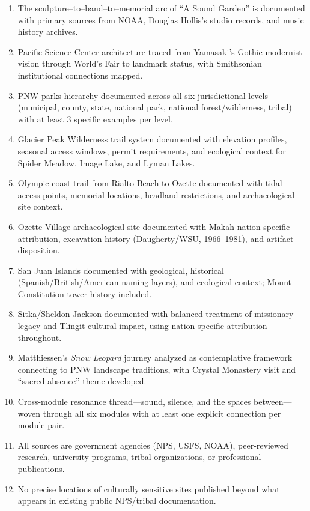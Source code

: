 \documentclass[11pt,letterpaper]{article}
\begin{document}
\begin{enumerate}[leftmargin=2em]
\item The sculpture--to--band--to--memorial arc of ``A Sound Garden'' is documented with primary sources from NOAA, Douglas Hollis's studio records, and music history archives.
\item Pacific Science Center architecture traced from Yamasaki's Gothic-modernist vision through World's Fair to landmark status, with Smithsonian institutional connections mapped.
\item PNW parks hierarchy documented across all six jurisdictional levels (municipal, county, state, national park, national forest/wilderness, tribal) with at least 3 specific examples per level.
\item Glacier Peak Wilderness trail system documented with elevation profiles, seasonal access windows, permit requirements, and ecological context for Spider Meadow, Image Lake, and Lyman Lakes.
\item Olympic coast trail from Rialto Beach to Ozette documented with tidal access points, memorial locations, headland restrictions, and archaeological site context.
\item Ozette Village archaeological site documented with Makah nation-specific attribution, excavation history (Daugherty/WSU, 1966--1981), and artifact disposition.
\item San Juan Islands documented with geological, historical (Spanish/British/American naming layers), and ecological context; Mount Constitution tower history included.
\item Sitka/Sheldon Jackson documented with balanced treatment of missionary legacy and Tlingit cultural impact, using nation-specific attribution throughout.
\item Matthiessen's \textit{Snow Leopard} journey analyzed as contemplative framework connecting to PNW landscape traditions, with Crystal Monastery visit and ``sacred absence'' theme developed.
\item Cross-module resonance thread---sound, silence, and the spaces between---woven through all six modules with at least one explicit connection per module pair.
\item All sources are government agencies (NPS, USFS, NOAA), peer-reviewed research, university programs, tribal organizations, or professional publications.
\item No precise locations of culturally sensitive sites published beyond what appears in existing public NPS/tribal documentation.
\end{enumerate}
\end{document}
